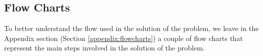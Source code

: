\subsection{Flow Charts}
\label{subsec:flow_charts}

To better understand the flow used in the solution of the problem, we leave in the Appendix section (Section \ref{appendix:flowcharts}) a couple of flow charts that represent the main steps involved in the solution of the problem.

